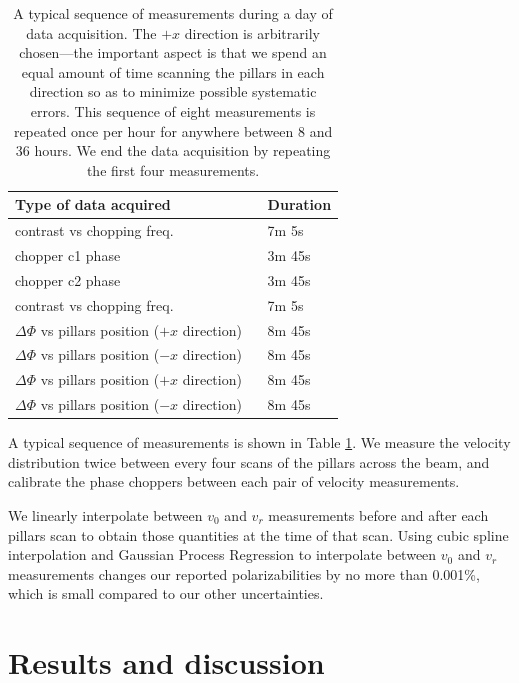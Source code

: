 \documentclass[twocolumn,pra,showpacs,superscriptaddress,longbibliography]{revtex4-1}   %
\newcommand{\sspace}{$\enspace$}
\begin{document}
\begingroup
\begin{table}
\caption{\label{schedule}A typical sequence of measurements during a day of data acquisition. The $+x$ direction is arbitrarily chosen---the important aspect is that we spend an equal amount of time scanning the pillars in each direction so as to minimize possible systematic errors. This sequence of eight measurements is repeated once per hour for anywhere between 8 and 36 hours. We end the data acquisition by repeating the first four measurements.}
\begin{center}
\begin{tabular}{l l}
\hline
\hline
Type of data acquired & Duration \\
\hline
contrast vs chopping freq. & 7m 5s \\
chopper c1 phase & 3m 45s \\
chopper c2 phase & 3m 45s\\
contrast vs chopping freq. & 7m 5s \\
$\Delta\Phi$ vs pillars position ($+x$ direction) \sspace & 8m 45s \\
$\Delta\Phi$ vs pillars position ($-x$ direction) & 8m 45s \\
$\Delta\Phi$ vs pillars position ($+x$ direction) & 8m 45s \\
$\Delta\Phi$ vs pillars position ($-x$ direction) & 8m 45s \\
\hline
\hline
\end{tabular}
\end{center}
\end{table}
\endgroup

A typical sequence of measurements is shown in Table \ref{schedule}.
We measure the velocity distribution twice between every four scans of the pillars across the beam, and calibrate the phase choppers between each pair of velocity measurements.

We linearly interpolate between $v_0$ and $v_r$ measurements before and after each pillars scan to obtain those quantities at the time of that scan.
Using cubic spline interpolation and Gaussian Process Regression to interpolate between $v_0$ and $v_r$ measurements changes our reported polarizabilities by no more than 0.001\%, which is small compared to our other uncertainties.

\section{Results and discussion} \label{sectionResults}
\end{document}
